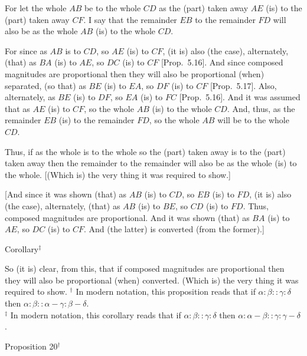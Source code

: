 \epsfysize=0.6in
\centerline{}

For let the whole $AB$ be to the whole $CD$ as the (part) taken away $AE$
(is) to the (part) taken away $CF$. I say that the remainder $EB$
to the remainder $FD$ will also be as the whole $AB$ (is) to the whole $CD$.

For since as $AB$ is to $CD$, so $AE$ (is) to $CF$, (it is) also (the case), alternately, 
(that) as $BA$ (is)
to $AE$, so $DC$ (is) to $CF$ [Prop.~5.16].
And since composed magnitudes are proportional then they will also
be proportional (when) separated, (so that) as $BE$ (is) to $EA$, so $DF$ (is)
to $CF$ [Prop.~5.17].
Also, alternately, as $BE$ (is) to $DF$, so $EA$ (is) to $FC$ [Prop.~5.16]. And it was assumed that as
$AE$ (is) to $CF$, so the whole $AB$ (is) to the whole $CD$. And, thus,  as the
remainder $EB$ (is) to the remainder $FD$, so the whole $AB$ will be to the
whole $CD$.

Thus, if as the whole is to the whole so the (part) taken
away is to the (part) taken away then the remainder to the remainder will
also be as the whole (is) to the whole. [(Which is) the very thing it was required to show.]

\mbox{[}And since it was shown (that) as $AB$ (is) to $CD$, so $EB$ (is) to $FD$, (it is)
also (the case), alternately, (that) as $AB$ (is) to $BE$, so $CD$ (is) to $FD$. 
Thus, composed magnitudes are proportional. And it was shown
(that) as $BA$ (is) to $AE$, so $DC$ (is) to $CF$. And (the latter) is converted (from the former).]\\

\begin{center}
{\large Corollary}$^\ddag$
\end{center}\vspace*{-7pt}

So (it is) clear, from this, that if composed magnitudes are proportional
then they will also be proportional (when) converted.
(Which is) the very thing it was required to show.
{\footnotesize \noindent$^\dag$ In modern notation, this proposition
reads that if $\alpha:\beta::\gamma:\delta$ then
$\alpha:\beta::\alpha-\gamma:\beta-\delta$.\\[0.5ex]
$^\ddag$ In modern notation, this corollary reads
that if $\alpha:\beta::\gamma:\delta$ then $\alpha:\alpha-\beta::\gamma:\gamma-\delta$.}


\begin{center}
{\large Proposition 20}$^\dag$
\end{center}

